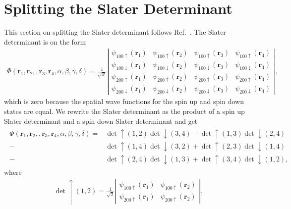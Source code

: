 \documentclass[../main.tex]{subfiles}
\begin{document}
\section{Splitting the Slater Determinant}
This section on splitting the Slater determinant follows Ref.~\cite{FYS4411-Slides}.
The Slater determinant is on the form 
\begin{align}
    \Phi(\mathbf{r}_1,\mathbf{r}_2,,\mathbf{r}_3,\mathbf{r}_4, \alpha,\beta,\gamma,\delta)=\frac{1}{\sqrt{4!}}
\left| \begin{array}{cccc} \psi_{100\uparrow}(\mathbf{r}_1)& \psi_{100\uparrow}(\mathbf{r}_2)& \psi_{100\uparrow}(\mathbf{r}_3)&\psi_{100\uparrow}(\mathbf{r}_4) \\
\psi_{100\downarrow}(\mathbf{r}_1)& \psi_{100\downarrow}(\mathbf{r}_2)& \psi_{100\downarrow}(\mathbf{r}_3)&\psi_{100\downarrow}(\mathbf{r}_4) \\
\psi_{200\uparrow}(\mathbf{r}_1)& \psi_{200\uparrow}(\mathbf{r}_2)& \psi_{200\uparrow}(\mathbf{r}_3)&\psi_{200\uparrow}(\mathbf{r}_4) \\
\psi_{200\downarrow}(\mathbf{r}_1)& \psi_{200\downarrow}(\mathbf{r}_2)& \psi_{200\downarrow}(\mathbf{r}_3)&\psi_{200\downarrow}(\mathbf{r}_4) \end{array} \right|, 
\end{align}
which is zero because the spatial wave functions for the spin up and spin down states are equal. We rewrite the Slater determinant as the product of a spin up Slater determinant and a spin down Slater determinant and get 
\begin{align}
\begin{split}
    \Phi(\mathbf{r}_1,\mathbf{r}_2,,\mathbf{r}_3,\mathbf{r}_4, \alpha,\beta,\gamma,\delta)=&\det\uparrow(1,2)\det\downarrow(3,4)-\det\uparrow(1,3)\det\downarrow(2,4)\\
    -&\det\uparrow(1,4)\det\downarrow(3,2)+\det\uparrow(2,3)\det\downarrow(1,4)\\
    -&\det\uparrow(2,4)\det\downarrow(1,3)+\det\uparrow(3,4)\det\downarrow(1,2),
\end{split}
\end{align}
where
\begin{align}
    \det\uparrow(1,2)=\frac{1}{\sqrt{2}}\left| \begin{array}{cc} \psi_{100\uparrow}(\mathbf{r}_1)& \psi_{100\uparrow}(\mathbf{r}_2)\\
    \psi_{200\uparrow}(\mathbf{r}_1)& \psi_{200\uparrow}(\mathbf{r}_2) \end{array} \right|,
\end{align}
\end{document}
